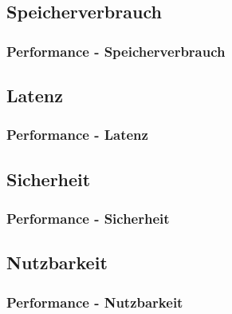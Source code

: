 \documentclass{beamer}
\begin{document}
        \subsection{Speicherverbrauch}
            \begin{frame}
                \frametitle{Performance - Speicherverbrauch}
            \end{frame}

        \subsection{Latenz}
            \begin{frame}
                \frametitle{Performance - Latenz}
            \end{frame}

        \subsection{Sicherheit}
            \begin{frame}
                \frametitle{Performance - Sicherheit}
            \end{frame}

        \subsection{Nutzbarkeit}
            \begin{frame}
                \frametitle{Performance - Nutzbarkeit}
            \end{frame}
\end{document}
